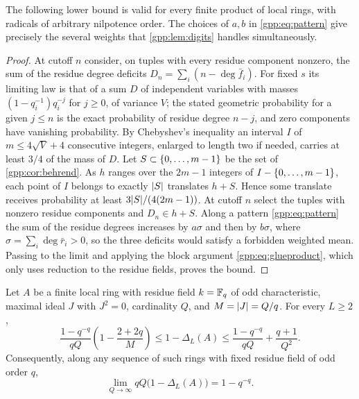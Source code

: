 The following lower bound is valid for every finite product of local rings, with radicals
of arbitrary nilpotence order. The choices of $a,b$ in \eqref{gpp:eq:pattern} give
precisely the several weights that \cref{gpp:lem:digits} handles simultaneously.


\begin{proof}
At cutoff $n$ consider, on tuples with every residue component nonzero, the sum of the
residue degree deficits $D_n=\sum_i(n-\deg\bar f_i)$. For fixed $s$ its limiting law is
that of a sum $D$ of independent variables with masses $(1-q_i^{-1})q_i^{-j}$ for
$j\ge0$, of variance $V$; the stated geometric probability for a given $j\le n$ is the
exact probability of residue degree $n-j$, and zero components have vanishing
probability. By Chebyshev's inequality an interval $I$ of $m\le4\sqrt V+4$ consecutive
integers, enlarged to length two if needed, carries at least $3/4$ of the mass of $D$.
Let $S\subset\{0,\ldots,m-1\}$ be the set of \cref{gpp:cor:behrend}. As $h$ ranges over
the $2m-1$ integers of $I-\{0,\ldots,m-1\}$, each point of $I$ belongs to exactly
$\lvert S\rvert$ translates $h+S$. Hence some translate receives probability at least
$3\lvert S\rvert/(4(2m-1))$. At cutoff $n$ select the tuples with nonzero residue components and
$D_n\in h+S$. Along a pattern \eqref{gpp:eq:pattern} the sum of the residue degrees
increases by $a\sigma$ and then by $b\sigma$, where $\sigma=\sum_i\deg\bar r_i>0$, so the
three deficits would satisfy a forbidden weighted mean. Passing to the limit and applying
the block argument \eqref{gpp:eq:glueproduct}, which only uses reduction to the residue
fields, proves the bound.
\end{proof}

\begin{theorem}\label{gpp:thm:oddleading}
Let $A$ be a finite local ring with residue field $k=\mathbb{F}_q$ of odd characteristic, maximal
ideal $J$ with $J^2=0$, cardinality $Q$, and $M=\lvert J\rvert=Q/q$. For every $L\ge2$,
\[
 \frac{1-q^{-q}}{qQ}\left(1-\frac{2+2q}{M}\right)
 \le1-\Delta_L(A)\le\frac{1-q^{-q}}{qQ}+\frac{q+1}{Q^2}.
\]
Consequently, along any sequence of such rings with fixed residue field of odd order $q$,
\[
 \lim_{Q\to\infty}qQ\bigl(1-\Delta_L(A)\bigr)=1-q^{-q}.
\]
\end{theorem}

